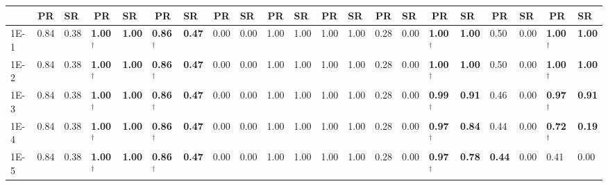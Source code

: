 \begin{table*}[h]
{\begin{tabular}{|p{4.8mm}|p{4.4mm}|p{4.4mm}|p{4.4mm}|p{4.4mm}|p{4.4mm}|p{4.4mm}|p{4.4mm}|p{4.4mm}|p{4.4mm}|p{4.4mm}|p{4.4mm}|p{4.4mm}|p{4.4mm}|p{4.4mm}|p{4.4mm}|p{4.4mm}|p{4.4mm}|p{4.4mm}|p{4.4mm}|p{4.4mm}|}
    \cline{2-21}
     & \multicolumn{1}{c|}{PR} & SR & \multicolumn{1}{c|}{PR} & SR & \multicolumn{1}{c|}{PR} & SR & \multicolumn{1}{c|}{PR} & SR & \multicolumn{1}{c|}{PR} & SR & \multicolumn{1}{c|}{PR} & SR & \multicolumn{1}{c|}{PR} & SR & \multicolumn{1}{c|}{PR} & SR & \multicolumn{1}{c|}{PR} & SR & \multicolumn{1}{c|}{PR} & SR \\
    \hline
    1E-1 & 0.84 & 0.38 & \textcolor{customblue}{\textbf{1.00$^\dagger$}} & \textcolor{customblue}{\textbf{1.00}} & \textcolor{customred}{\textbf{0.86$^\dagger$}} & \textcolor{customred}{\textbf{0.47}} & 0.00 & 0.00 & 1.00 & 1.00 & 1.00 & 1.00 & 0.28 & 0.00 & \textcolor{customblue}{\textbf{1.00$^\dagger$}} & \textcolor{customblue}{\textbf{1.00}} & 0.50 & 0.00 & \textcolor{customblue}{\textbf{1.00$^\dagger$}} & \textcolor{customblue}{\textbf{1.00}} \\
    1E-2 & 0.84 & 0.38 & \textcolor{customblue}{\textbf{1.00$^\dagger$}} & \textcolor{customblue}{\textbf{1.00}} & \textcolor{customred}{\textbf{0.86$^\dagger$}} & \textcolor{customred}{\textbf{0.47}} & 0.00 & 0.00 & 1.00 & 1.00 & 1.00 & 1.00 & 0.28 & 0.00 & \textcolor{customblue}{\textbf{1.00$^\dagger$}} & \textcolor{customblue}{\textbf{1.00}} & 0.50 & 0.00 & \textcolor{customblue}{\textbf{1.00$^\dagger$}} & \textcolor{customblue}{\textbf{1.00}} \\
    1E-3 & 0.84 & 0.38 & \textcolor{customblue}{\textbf{1.00$^\dagger$}} & \textcolor{customblue}{\textbf{1.00}} & \textcolor{customred}{\textbf{0.86$^\dagger$}} & \textcolor{customred}{\textbf{0.47}} & 0.00 & 0.00 & 1.00 & 1.00 & 1.00 & 1.00 & 0.28 & 0.00 & \textcolor{customblue}{\textbf{0.99$^\dagger$}} & \textcolor{customblue}{\textbf{0.91}} & 0.46 & 0.00 & \textcolor{customblue}{\textbf{0.97$^\dagger$}} & \textcolor{customblue}{\textbf{0.91}} \\
    1E-4 & 0.84 & 0.38 & \textcolor{customblue}{\textbf{1.00$^\dagger$}} & \textcolor{customblue}{\textbf{1.00}} & \textcolor{customred}{\textbf{0.86$^\dagger$}} & \textcolor{customred}{\textbf{0.47}} & 0.00 & 0.00 & 1.00 & 1.00 & 1.00 & 1.00 & 0.28 & 0.00 & \textcolor{customblue}{\textbf{0.97$^\dagger$}} & \textcolor{customblue}{\textbf{0.84}} & 0.44 & 0.00 & \textcolor{customblue}{\textbf{0.72$^\dagger$}} & \textcolor{customblue}{\textbf{0.19}} \\
    1E-5 & 0.84 & 0.38 & \textcolor{customblue}{\textbf{1.00$^\dagger$}} & \textcolor{customblue}{\textbf{1.00}} & \textcolor{customred}{\textbf{0.86$^\dagger$}} & \textcolor{customred}{\textbf{0.47}} & 0.00 & 0.00 & 1.00 & 1.00 & 1.00 & 1.00 & 0.28 & 0.00 & \textcolor{customblue}{\textbf{0.97$^\dagger$}} & \textcolor{customblue}{\textbf{0.78}} & \textcolor{customred}{\textbf{0.44}} & 0.00 & 0.41 & 0.00 \\

\end{tabular}}
\end{table*}

